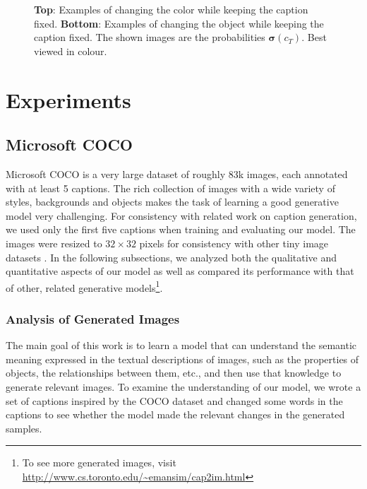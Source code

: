 \documentclass{article} %
\newcommand{\sigmoid}{\boldsymbol{\sigma}}
\newcommand{\canv}{c}
\begin{document}
\begin{figure}[!t]
\begin{center}
\quad
%
\quad
%
\end{center}
\caption{\small
 \textbf{Top}: Examples of changing the color while keeping the caption fixed.
 \textbf{Bottom}: Examples of changing the object while keeping the caption fixed.
 The shown images are the probabilities $\sigmoid(\canv_{T})$. Best viewed in colour.}
\label{fig:genimages3}
\vspace{-0.1in}
\end{figure}

\section{Experiments}
\vspace{-0.05in}
\subsection{Microsoft COCO}
\vspace{-0.05in}
Microsoft COCO \citep{mscoco} is a very large dataset of roughly 83k images, each annotated with at least 5 captions. The rich collection of images with a wide variety of styles, backgrounds and objects makes the task of learning a good generative model 
very challenging. For consistency with related work on caption generation, we used only the first five captions when training and evaluating our model. 
The images were resized to $32 \times 32$ pixels for consistency with other tiny image datasets \citep{krizhevsky_cifar}. In the following subsections, we analyzed both the qualitative and quantitative aspects of our model as well as compared its performance with that of other, related generative models\footnote{To see more
generated images, visit \url{http://www.cs.toronto.edu/~emansim/cap2im.html}}.

\subsubsection{Analysis of Generated Images}
\vspace{-0.05in}
The main goal of this work is to learn a model that can understand the semantic meaning expressed in the textual descriptions of images, such as the properties of objects, the relationships between them, etc., and then use that knowledge to generate relevant images. To examine the understanding of our model, we wrote a set of captions inspired by the COCO dataset and changed some words in the captions to see whether the model made the relevant changes in the generated samples.
\end{document}
